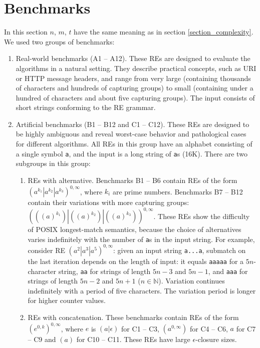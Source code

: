 \documentclass[AMA,STIX1COL]{WileyNJD-v2}
\newcommand{\YN}{\mathbb{N}}
\begin{document}
\section{Benchmarks}\label{section_benchmarks}

In this section $n$, $m$, $t$ have the same meaning as in section \ref{section_complexity}.
%
We used two groups of benchmarks:
\begin{enumerate}[itemsep=0.2em, topsep=0.5em]
\item Real-world benchmarks (A1 -- A12).
    These REs are designed to evaluate the algorithms in a natural setting.
    They describe practical concepts, such as URI or HTTP message headers,
    and range from very large (containing thousands of characters and hundreds of capturing groups)
    to small (containing under a hundred of characters and about five capturing groups).
    The input consists of short strings conforming to the RE grammar.

\item Artificial benchmarks (B1 -- B12 and C1 -- C12).
    These REs are designed to be highly ambiguous and reveal worst-case behavior and pathological cases for different algorithms.
    All REs in this group have an alphabet consisting of a single symbol \texttt{a},
    and the input is a long string of \texttt{a}s (16K).
    There are two subgroups in this group:
    \begin{enumerate}
    \item REs with alternative.
        Benchmarks B1 -- B6 contain REs of the form $(a^{k_1}|a^{k_2}|a^{k_3})^{0,\infty}$, where $k_i$ are prime numbers.
        Benchmarks B7 -- B12 contain their variations with more capturing groups: $(((a)^{k_1})|((a)^{k_2})|((a)^{k_3}))^{0,\infty}$.
        These REs show the difficulty of POSIX longest-match semantics,
        because the choice of alternatives varies indefinitely with the number of \texttt{a}s in the input string.
        For example, consider RE $(a^{2}|a^{3}|a^{5})^{0,\infty}$:
        given an input string \texttt{a...a},
        submatch on the last iteration depends on the length of input:
        it equals \texttt{aaaaa} for a $5n$-character string,
        \texttt{aa} for strings of length $5n - 3$ and $5n - 1$,
        and \texttt{aaa} for strings of length $5n - 2$ and $5n + 1$ ($n \in \YN$).
        Variation continues indefinitely with a period of five characters.
        The variation period is longer for higher counter values.

    \item REs with concatenation.
        These benchmarks contain REs of the form $(e^{0,k})^{0,\infty}$, where $e$ is
        $(a|\epsilon)$ for C1 -- C3,
        $(a^{0,\infty})$ for C4 -- C6,
        $a$ for C7 -- C9 and
        $(a)$ for C10 -- C11.
        These REs have large $\epsilon$-closure sizes.
    \\[-0.5em]
    \end{enumerate}
\end{enumerate}
\end{document}
